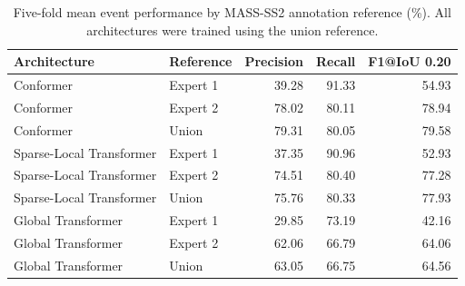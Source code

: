 \begin{table}[!t]
\centering
\caption{Five-fold mean event performance by MASS-SS2 annotation reference (\%). All architectures were trained using the union reference.}
\label{tab:mass-reference-sensitivity}
\footnotesize
\begin{tabular}{llrrr}
\toprule
Architecture & Reference & Precision & Recall & F1@IoU 0.20 \\
\midrule
Conformer & Expert 1 & 39.28 & 91.33 & 54.93 \\
Conformer & Expert 2 & 78.02 & 80.11 & 78.94 \\
Conformer & Union & 79.31 & 80.05 & 79.58 \\
Sparse-Local Transformer & Expert 1 & 37.35 & 90.96 & 52.93 \\
Sparse-Local Transformer & Expert 2 & 74.51 & 80.40 & 77.28 \\
Sparse-Local Transformer & Union & 75.76 & 80.33 & 77.93 \\
Global Transformer & Expert 1 & 29.85 & 73.19 & 42.16 \\
Global Transformer & Expert 2 & 62.06 & 66.79 & 64.06 \\
Global Transformer & Union & 63.05 & 66.75 & 64.56 \\
\bottomrule
\end{tabular}
\end{table}
